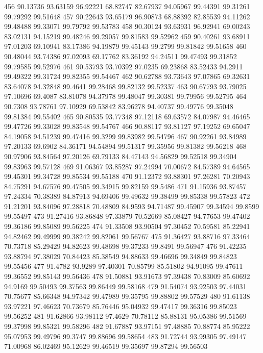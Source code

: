 456	90.13736	93.63159	96.92221	68.82747	82.67937	94.05967	99.44391	99.31261	99.79292	99.51648
457	90.22643	93.65179	96.90873	68.88392	82.85539	94.11262	99.48488	99.33071	99.79792	99.53783
458	90.30124	93.63931	96.92941	69.00243	83.02131	94.15219	99.48246	99.29057	99.81583	99.52962
459	90.40261	93.68911	97.01203	69.10941	83.17386	94.19879	99.45143	99.2799	99.81842	99.51658
460	90.48044	93.74386	97.02093	69.17762	83.36192	94.24511	99.47493	99.31852	99.79585	99.52976
461	90.53793	93.70392	97.0235	69.23868	83.52433	94.2911	99.49322	99.31724	99.82355	99.54467
462	90.62788	93.73643	97.07865	69.32631	83.64078	94.32848	99.4641	99.28468	99.82132	99.52337
463	90.67793	93.79025	97.10696	69.4087	83.81078	94.37978	99.48047	99.30381	99.79956	99.52795
464	90.7308	93.78761	97.10929	69.53842	83.96278	94.40737	99.49776	99.35048	99.81384	99.55402
465	90.80535	93.77348	97.12118	69.63572	84.07987	94.46465	99.47726	99.33028	99.83548	99.54767
466	90.88117	93.81127	97.19252	69.65047	84.19058	94.51239	99.47416	99.3299	99.83982	99.54796
467	90.92261	93.84989	97.20133	69.6902	84.36171	94.54894	99.51317	99.35956	99.81382	99.56218
468	90.97906	93.84564	97.20126	69.79133	84.47143	94.56829	99.52518	99.34904	99.83963	99.57128
469	91.06367	93.85287	97.24994	70.00672	84.57389	94.64565	99.45301	99.34728	99.85534	99.55188
470	91.12372	93.88301	97.26281	70.20943	84.75291	94.67576	99.47505	99.34915	99.82159	99.5486
471	91.15936	93.87457	97.24334	70.38389	84.87913	94.69406	99.49632	99.38499	99.85338	99.57823
472	91.21201	93.84096	97.28818	70.48809	84.9593	94.71487	99.45907	99.34594	99.8599	99.55497
473	91.27416	93.86848	97.33879	70.52669	85.08427	94.77653	99.47402	99.36186	99.85089	99.56225
474	91.33508	93.90504	97.30452	70.59581	85.22941	94.82462	99.49999	99.38242	99.82061	99.56767
475	91.36427	93.88716	97.33464	70.73718	85.29429	94.82623	99.48698	99.37233	99.8491	99.56947
476	91.42235	93.88794	97.38029	70.84423	85.38549	94.88633	99.46696	99.34849	99.84823	99.55456
477	91.4782	93.9289	97.40301	70.85799	85.51802	94.91095	99.47611	99.36552	99.85143	99.56436
478	91.50881	93.91673	97.39438	70.83009	85.60692	94.9169	99.50493	99.37563	99.86449	99.58168
479	91.54074	93.92503	97.44031	70.75677	85.66348	94.97342	99.47989	99.35795	99.88802	99.57529
480	91.61138	93.97221	97.46623	70.73679	85.76446	95.04932	99.47417	99.36316	99.85023	99.56252
481	91.62866	93.98112	97.4629	70.78112	85.88131	95.05386	99.51569	99.37998	99.85321	99.58296
482	91.67887	93.97151	97.48885	70.88774	85.95222	95.07953	99.49796	99.3747	99.88696	99.58654
483	91.72744	93.99305	97.49147	71.00968	86.02469	95.12629	99.46519	99.35697	99.87294	99.56503
